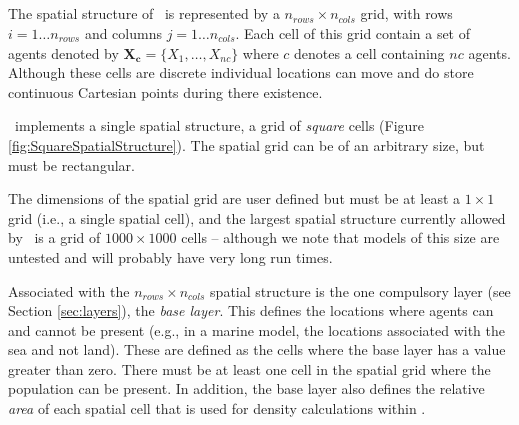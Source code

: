 %		

\subsection{\label{sec:spatial-structure}}
The spatial structure of \IBM\ is represented by a $n_{rows} \times n_{cols}$ grid, with rows $i=1 \dots n_{rows}$ and columns $j=1 \ldots n_{cols}$. Each cell of this grid contain a set of agents denoted by \(\bm{X_c} = \{X_1, \dots, X_{nc}\}\) where \(c\) denotes a cell containing \(nc\) agents. Although these cells are discrete individual locations can move and do store continuous Cartesian points during there existence. 

\IBM\ implements a single spatial structure, a grid of \emph{square} cells (Figure \ref{fig:SquareSpatialStructure}). The spatial grid can be of an arbitrary size, but must be rectangular. 

The dimensions of the spatial grid are user defined but must be at least a $1 \times 1$ grid (i.e., a single spatial cell), and the largest spatial structure currently allowed by \IBM\ is a grid of $1000 \times 1000$ cells -- although we note that models of this size are untested and will probably have very long run times. 

Associated with the $n_{rows} \times n_{cols}$ spatial structure is the one compulsory layer (see Section \ref{sec:layers}), the \emph{base layer}. This defines the locations where agents can and cannot be present (e.g., in a marine model, the locations associated with the sea and not land). These are defined as the cells where the base layer has a value greater than zero. There must be at least one cell in the spatial grid where the population can be present. In addition, the base layer also defines the relative \emph{area} of each spatial cell that is used for density calculations within \IBM.

